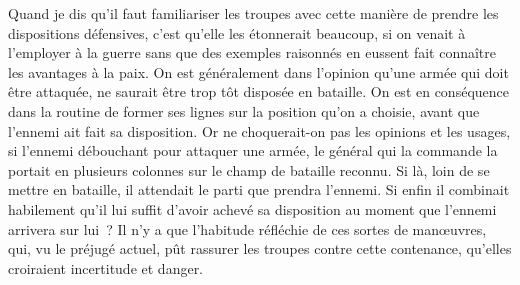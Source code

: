 \documentclass[french,twoside]{book} %
\begin{document}
Quand je dis qu’il faut familiariser les troupes avec cette manière de prendre les dispositions défensives, c’est qu’elle les étonnerait beaucoup, si on venait à l’employer à la guerre sans que des exemples raisonnés en eussent fait connaître les avantages à la paix. On est généralement dans l’opinion qu’une armée qui doit être attaquée, ne saurait être trop tôt disposée en bataille. On est en conséquence dans la routine de former ses lignes sur la position qu’on a choisie, avant que l’ennemi ait fait sa disposition. Or ne choquerait-on pas les opinions et les usages, si l’ennemi débouchant pour attaquer une armée, le général qui la commande la portait en plusieurs colonnes sur le champ de bataille reconnu. Si là, loin de se mettre en bataille, il attendait le parti que prendra l’ennemi. Si enfin il combinait habilement qu’il lui suffit d’avoir achevé sa disposition au moment que l’ennemi arrivera sur lui ? Il n’y a que l’habitude réfléchie de ces sortes de manœuvres, qui, vu le préjugé actuel, pût rassurer les troupes contre cette contenance, qu’elles croiraient incertitude et danger.
\end{document}
